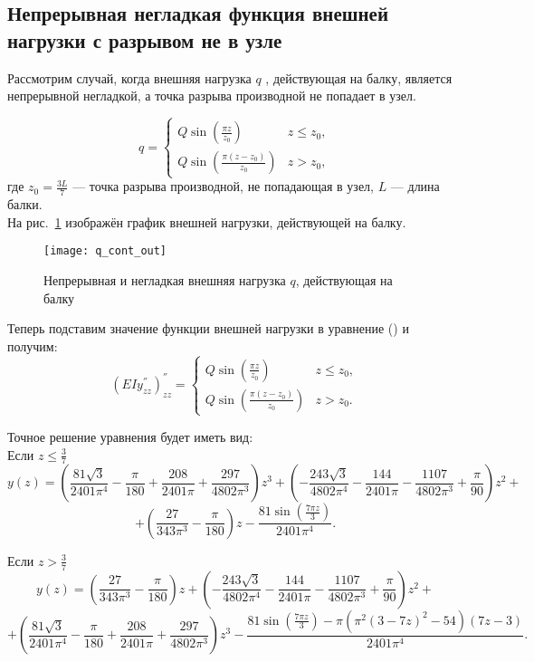 \documentclass[12pt,a4paper]{article}
\begin{document}
\subsection{Непрерывная негладкая функция внешней нагрузки с разрывом не в узле}

Рассмотрим случай, когда внешняя нагрузка $q$ , действующая на балку, является непрерывной негладкой, а точка разрыва производной не попадает в узел.
 
\[
q = 
 \begin{cases}
Q \sin \left(\frac{\pi  z}{z_{0}} \right)   &  z \leq z_{0}, \\
Q \sin \left(\frac{\pi  (z-z_{0})}{z_{0}} \right) & z > z_{0},
 \end{cases}
\]
где $z_{0}=\frac{3L}{7}$ --- точка разрыва производной, не попадающая в узел,  $L$ --- длина балки. \\

На рис.~\ref{fig:q_cont_out} изображён график внешней нагрузки, действующей на балку.
	\begin{figure}[H]
		\centering
		\texttt{[image: q\_cont\_out]}
		\caption{Непрерывная и негладкая внешняя нагрузка $q$, действующая на балку}
		\label{fig:q_cont_out}
	\end{figure}

Теперь подставим значение функции внешней нагрузки в уравнение () и получим:\\

\[
(EIy^{''}_{zz})^{''}_{zz} = 
 \begin{cases}
 	Q \sin \left(\frac{\pi  z}{z_{0}}\right)   &  z\leq z_{0}, \\
	Q \sin\left(\frac{\pi  (z-z_{0})}{z_{0}}\right) & z > z_{0}.
 \end{cases}
\]


Точное решение уравнения будет иметь вид:\\

Если $z \leq \frac{3}{7}$ 
$$y(z)= \left(\frac{81 \sqrt{3}}{2401 \pi ^4}-\frac{\pi }{180}+\frac{208}{2401 \pi }+\frac{297}{4802 \pi ^3}\right) z^3+\left(-\frac{243 \sqrt{3}}{4802 \pi ^4}-\frac{144}{2401 \pi }-\frac{1107}{4802 \pi ^3}+\frac{\pi }{90}\right) z^2+$$
$$+\left(\frac{27}{343 \pi ^3}-\frac{\pi }{180}\right) z -\frac{81 \sin \left(\frac{7 \pi  z}{3}\right)}{2401 \pi ^4}.$$

Если $z > \frac{3}{7}$
$$  y(z)= \left(\frac{27}{343 \pi ^3}-\frac{\pi }{180}\right) z+\left(-\frac{243 \sqrt{3}}{4802 \pi ^4}-\frac{144}{2401 \pi }-\frac{1107}{4802 \pi ^3}+\frac{\pi }{90}\right) z^2+$$
$$+\left(\frac{81 \sqrt{3}}{2401 \pi ^4}-\frac{\pi }{180}+\frac{208}{2401 \pi }+\frac{297}{4802 \pi ^3}\right) z^3 - \frac{81 \sin \left(\frac{7 \pi  z}{3}\right)-\pi  \left(\pi ^2 (3-7 z)^2-54\right) (7 z-3)}{2401 \pi ^4}.$$ \\
\end{document}
